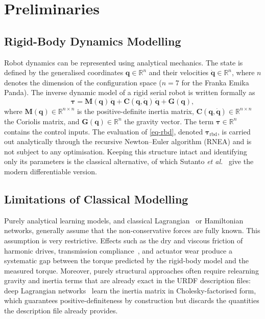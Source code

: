 \documentclass[a4paper, oneside]{article}
\newcommand{\q}{\ensuremath{\boldsymbol{q}}}
\newcommand{\qd}{\ensuremath{\boldsymbol{\dot{q}}}}
\newcommand{\qdd}{\ensuremath{\boldsymbol{\ddot{q}}}}
\newcommand{\taurbd}{\ensuremath{\boldsymbol{\tau}_{\mathrm{rbd}}}}
\newcommand{\Rset}{\ensuremath{\mathbb{R}}}
\begin{document}
\section{Preliminaries}
\label{sec-prelim}

\subsection{Rigid-Body Dynamics Modelling}
\label{sec-prelim-dyn}

Robot dynamics can be represented using analytical mechanics. The state is defined by the generalised coordinates $\q \in \Rset^{n}$ and their velocities $\qd \in \Rset^{n}$, where $n$ denotes the dimension of the configuration space ($n = 7$ for the Franka Emika Panda). The inverse dynamic model of a rigid serial robot is written formally as
%
\begin{equation}
    \boldsymbol{\tau} = \boldsymbol{M}(\q)\,\qdd + \boldsymbol{C}(\q,\qd)\,\qd + \boldsymbol{G}(\q) ,
    \label{eq-rbd}
\end{equation}
%
where $\boldsymbol{M}(\q) \in \Rset^{n \times n}$ is the positive-definite inertia matrix, $\boldsymbol{C}(\q,\qd) \in \Rset^{n \times n}$ the Coriolis matrix, and $\boldsymbol{G}(\q) \in \Rset^{n}$ the gravity vector. The term $\boldsymbol{\tau} \in \Rset^{n}$ contains the control inputs. The evaluation of \cref{eq-rbd}, denoted $\taurbd$, is carried out analytically through the recursive Newton--Euler algorithm (RNEA) and is not subject to any optimisation. Keeping this structure intact and identifying only its parameters is the classical alternative, of which Sutanto \emph{et al.}~\cite{sutanto2020} give the modern differentiable version.

\subsection{Limitations of Classical Modelling}
\label{sec-prelim-limits}

Purely analytical learning models, and classical Lagrangian~\cite{lutter2019iclr, lutter2019iros} or Hamiltonian~\cite{duong2024, wang2025spel} networks, generally assume that the non-conservative forces are fully known. This assumption is very restrictive. Effects such as the dry and viscous friction of harmonic drives, transmission compliance~\cite{li2025compliant}, and actuator wear produce a systematic gap between the torque predicted by the rigid-body model and the measured torque. Moreover, purely structural approaches often require relearning gravity and inertia terms that are already exact in the URDF description files: deep Lagrangian networks~\cite{lutter2019iclr} learn the inertia matrix in Cholesky-factorised form, which guarantees positive-definiteness by construction but discards the quantities the description file already provides.
\end{document}
